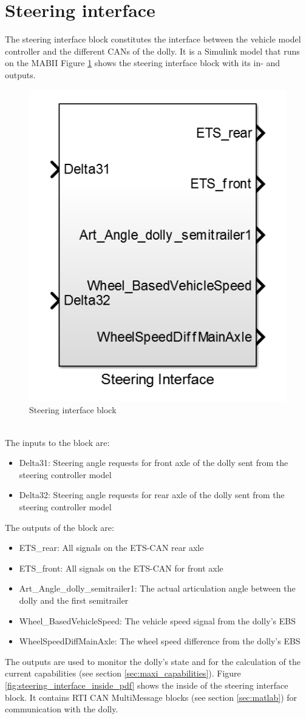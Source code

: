 \documentclass[ExampleMasters.tex]{subfiles}
\begin{document}
	
\section{Steering interface}
\label{sec:steering_interface}
The steering interface block constitutes the interface between the vehicle model controller and the different \gls{CAN}s of the dolly. It is a Simulink model that runs on the \gls{MABII}
Figure \ref{fig:steering_interface} shows the steering interface block with its in- and outputs. 
\begin{figure}[!htb]
	\centering
	\includegraphics[width=0.5\linewidth]{figures/steering_interface}
	
	\caption{Steering interface block}
	\label{fig:steering_interface}
\end{figure} \\
The inputs to the block are:
\begin{itemize}
	\item Delta31: Steering angle requests for front axle of the dolly sent from the steering controller model
	\item Delta32: Steering angle requests for rear axle of the dolly sent from the steering controller model
\end{itemize} 
 The outputs of the block are:
 \begin{itemize}
 	\item ETS\_rear: All signals on the \gls{ETS}-\gls{CAN} rear axle
 	\item ETS\_front: All signals on the \gls{ETS}-\gls{CAN} for front axle
 	\item Art\_Angle\_dolly\_semitrailer1: The actual articulation angle between the dolly and the first semitrailer
 	\item Wheel\_BasedVehicleSpeed: The vehicle speed signal from the dolly's \gls{EBS}
 	\item WheelSpeedDiffMainAxle: The wheel speed difference from the dolly's \gls{EBS}
 \end{itemize}
 The outputs are used to monitor the dolly's state and for the calculation of the current capabilities (see section \ref{sec:maxi_capabilities}).
 Figure \ref{fig:steering_interface_inside_pdf} shows the inside of the steering interface block. It contains \gls{RTI} \gls{CAN} MultiMessage blocks (see section \ref{sec:matlab}) for communication with the dolly.   
 
\end{document}
